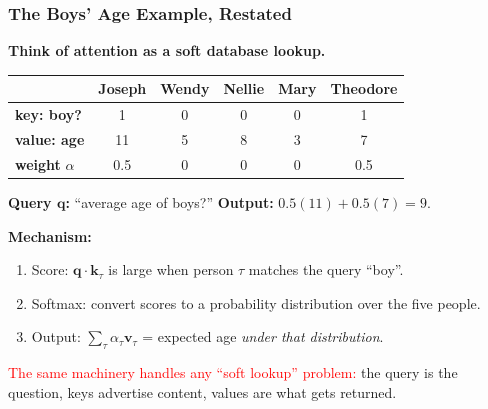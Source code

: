 \documentclass[notes,11pt, aspectratio=169]{beamer}
\newcommand{\vk}{\mathbf{k}}
\newcommand{\vq}{\mathbf{q}}
\newcommand{\vv}{\mathbf{v}}
\begin{document}
\begin{frame}
\frametitle{The Boys' Age Example, Restated}

\textbf{Think of attention as a soft database lookup.}

\vspace{5pt}
\begin{center}
\renewcommand{\arraystretch}{1.15}
\scriptsize
\begin{tabular}{l c c c c c}
\toprule
& Joseph & Wendy & Nellie & Mary & Theodore \\
\midrule
\textbf{key: boy?} & 1 & 0 & 0 & 0 & 1 \\
\textbf{value: age} & 11 & 5 & 8 & 3 & 7 \\
\textbf{weight} $\alpha$ & 0.5 & 0 & 0 & 0 & 0.5 \\
\bottomrule
\end{tabular}
\end{center}

\vspace{4pt}
\textbf{Query $\vq$:} ``average age of boys?'' \quad
\textbf{Output:} $0.5(11) + 0.5(7) = 9$.

\vspace{6pt}
\textbf{Mechanism:}
\begin{enumerate}
    \item Score: $\vq \cdot \vk_\tau$ is large when person $\tau$ matches the query ``boy''.
    \item Softmax: convert scores to a probability distribution over the five people.
    \item Output: $\sum_\tau \alpha_\tau \vv_\tau$ = expected age \emph{under that distribution}.
\end{enumerate}

\vspace{6pt}
\textcolor{red}{The same machinery handles any ``soft lookup'' problem:} the query is the question, keys advertise content, values are what gets returned.
\end{frame}
\end{document}
